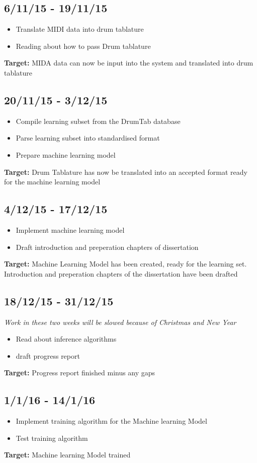 \documentclass[12pt,a4]{article}
\begin{document}
		\subsection{6/11/15 - 19/11/15}
		\begin{itemize}
			\item Translate MIDI data into drum tablature
			\item Reading about how to pass Drum tablature
		\end{itemize}
{\bf Target:} MIDA data can now be input into the system and translated into drum tablature
		\subsection{20/11/15 - 3/12/15}
		\begin{itemize}
			\item Compile learning subset from the DrumTab database
			\item Parse learning subset into standardised format
			\item Prepare machine learning model
		\end{itemize}
{\bf Target:} Drum Tablature has now be translated into an accepted format ready for the machine learning model
		\subsection{4/12/15 - 17/12/15}
\begin{itemize}
		\item Implement machine learning model
		\item Draft introduction and preperation chapters of dissertation
		\end{itemize}
{\bf Target:} Machine Learning Model has been created, ready for the learning set. Introduction and preperation chapters of the dissertation have been drafted
		\subsection{18/12/15 - 31/12/15}
\emph{Work in these two weeks will be slowed because of Christmas and New Year}
\begin{itemize}
		\item Read about inference algorithms
		\item draft progress report
\end{itemize}
{\bf Target:} Progress report finished minus any gaps
		\subsection{1/1/16 - 14/1/16}
\begin{itemize}
		\item Implement training algorithm for the Machine learning Model
		\item Test training algorithm

\end{itemize}
{\bf Target:} Machine learning Model trained
\end{document}
